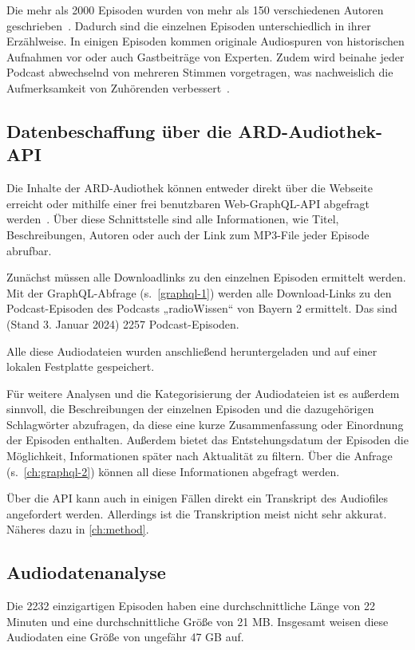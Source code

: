 Die mehr als 2000 Episoden wurden von mehr als 150 verschiedenen Autoren geschrieben~\cite{zotero-527}.
Dadurch sind die einzelnen Episoden unterschiedlich in ihrer Erzählweise.
In einigen Episoden kommen originale Audiospuren von historischen Aufnahmen vor oder auch Gastbeiträge von Experten.
Zudem wird beinahe jeder Podcast abwechselnd von mehreren Stimmen vorgetragen, was nachweislich die Aufmerksamkeit von Zuhörenden verbessert~\cite{kang2012}.

\subsection{Datenbeschaffung über die ARD-Audiothek-API}

Die Inhalte der ARD-Audiothek können entweder direkt über die Webseite erreicht oder mithilfe einer frei benutzbaren Web-GraphQL-API abgefragt werden~\cite{zotero-529}.
Über diese Schnittstelle sind alle Informationen, wie Titel, Beschreibungen, Autoren oder auch der Link zum MP3-File jeder Episode abrufbar.

Zunächst müssen alle Downloadlinks zu den einzelnen Episoden ermittelt werden.
Mit der GraphQL-Abfrage (s.~\autoref{graphql-1}) werden alle Download-Links zu den Podcast-Episoden des Podcasts „radioWissen“ von Bayern 2 ermittelt.
Das sind (Stand 3. Januar 2024) 2257 Podcast-Episoden.

Alle diese Audiodateien wurden anschließend heruntergeladen und auf einer lokalen Festplatte gespeichert.

Für weitere Analysen und die Kategorisierung der Audiodateien ist es außerdem sinnvoll, die Beschreibungen der einzelnen Episoden und die dazugehörigen Schlagwörter abzufragen, da diese eine kurze Zusammenfassung oder Einordnung der Episoden enthalten.
Außerdem bietet das Entstehungsdatum der Episoden die Möglichkeit, Informationen später nach Aktualität zu filtern.
Über die Anfrage (s.~\autoref{ch:graphql-2}) können all diese Informationen abgefragt werden.

Über die API kann auch in einigen Fällen direkt ein Transkript des Audiofiles angefordert werden.
Allerdings ist die Transkription meist nicht sehr akkurat.
Näheres dazu in \autoref{ch:method}.

\subsection{Audiodatenanalyse}

Die 2232 einzigartigen Episoden haben eine durchschnittliche Länge von 22 Minuten und eine durchschnittliche Größe von 21 MB.
Insgesamt weisen diese Audiodaten eine Größe von ungefähr 47 GB auf.

